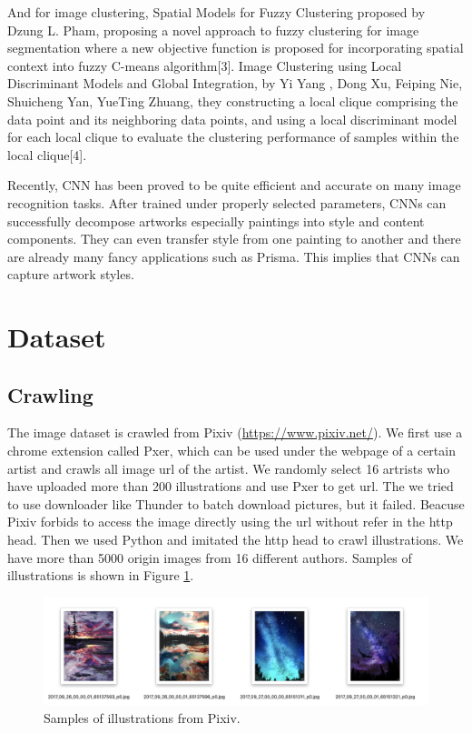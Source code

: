 \documentclass{article}
\begin{document}
And for image clustering, Spatial Models for Fuzzy Clustering proposed by Dzung L. Pham, proposing a novel approach to fuzzy clustering for image segmentation where a new objective function is proposed for incorporating spatial context into fuzzy C-means algorithm[3]. Image Clustering using Local Discriminant Models and Global Integration, by Yi Yang , Dong Xu, Feiping Nie, Shuicheng Yan, YueTing Zhuang, they constructing a local clique comprising the data point and its neighboring data points, and using a local discriminant model for each local clique to evaluate the clustering performance of samples within the local clique[4]. 

Recently, CNN has been proved to be quite efficient and accurate on many image recognition tasks. After trained under properly selected parameters, CNNs can successfully decompose artworks especially paintings into style and content components. They can even transfer style from one painting to another and there are already many fancy applications such as Prisma. This implies that CNNs can capture artwork styles.

\section{Dataset}
\subsection{Crawling}
The image dataset is crawled from Pixiv (\url{https://www.pixiv.net/}). We first use a chrome extension called Pxer, which can be used under the webpage of a certain artist and crawls all image url of the artist. We randomly select 16 artrists who have uploaded more than 200 illustrations and use Pxer to get url. The we tried to use downloader like Thunder to batch download pictures, but it failed. Beacuse Pixiv forbids to access the image directly using the url without refer in the http head. Then we used Python and imitated the http head to crawl illustrations. We have more than 5000 origin images from 16 different authors. Samples of illustrations is shown in Figure \ref{pixiv_sample}.

\begin{figure}[ht]
  \centering
  \includegraphics[width=0.94\linewidth]{pixiv_sample.png}
  \caption{Samples of illustrations from Pixiv.}
  \label{pixiv_sample}
\end{figure}
\end{document}
